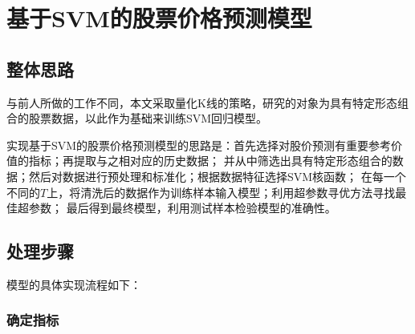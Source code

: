 \chapter{基于SVM的股票价格预测模型}

\section{整体思路}

与前人所做的工作不同，本文采取量化K线的策略，研究的对象为具有特定形态组合的股票数据，以此作为基础来训练SVM回归模型。

实现基于SVM的股票价格预测模型的思路是：首先选择对股价预测有重要参考价值的指标；再提取与之相对应的历史数据；
并从中筛选出具有特定形态组合的数据；然后对数据进行预处理和标准化；根据数据特征选择SVM核函数；
在每一个不同的$T$上，将清洗后的数据作为训练样本输入模型；利用超参数寻优方法寻找最佳超参数；
最后得到最终模型，利用测试样本检验模型的准确性。

\section{处理步骤}

模型的具体实现流程如下：

\subsection{确定指标}

